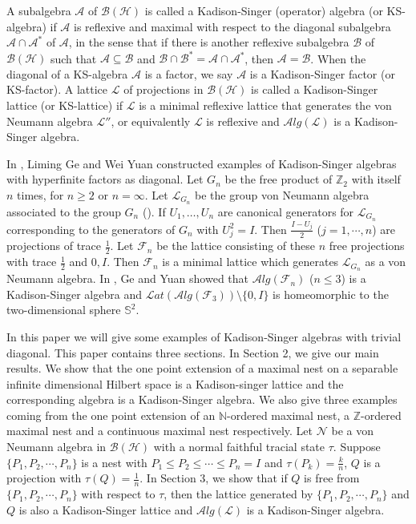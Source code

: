 \documentclass[12pt]{article}
\def\H{{\mathscr{H} }}\def\L{{\mathscr{L}}}
\def\NN{{\mathscr{ N}}}
\def\F{{\mathscr{F}}}
\def\N{{\mathbb{N}}}
\def\Z{{\mathbb{Z}}}\def\C{{\mathbb{C}}}
\def\Lat{{\mathcal Lat}}\def\Alg{{\mathcal Alg}}
\newcommand{\BBB}{\mathcal B}
\def\Lat{\mathcal Lat}
\def\Alg{\mathcal Alg}
\def\C{\mathbb C} %
\def\Z{\mathbb Z} %
\def\N{\mathbb N} %
\begin{document}
\quad A subalgebra $\mathscr{A}$ of
$\BBB(\H)$ is called a Kadison-Singer (operator) algebra (or
KS-algebra) if $\mathscr{A}$ is reflexive and maximal with respect
to the diagonal subalgebra $\mathscr{A}\cap \mathscr{A}^*$ of
$\mathscr{A}$, in the sense that if there is another reflexive
subalgebra $\mathscr{B}$ of $\BBB(\H)$ such that
$\mathscr{A}\subseteq\mathscr{B}$ and
$\mathscr{B}\cap\mathscr{B}^*=\mathscr{A}\cap\mathscr{A}^*$, then
$\mathscr{A}=\mathscr{B}$. When the diagonal of a KS-algebra
$\mathscr{A}$ is a factor, we say $\mathscr{A}$ is a Kadison-Singer
factor (or KS-factor). A lattice $\L$ of projections in $\BBB(\H)$
is called a Kadison-Singer lattice (or KS-lattice) if $\L$ is a
minimal reflexive lattice that generates the von Neumann algebra
$\L''$, or equivalently $\L$ is reflexive and $\Alg(\L)$ is a
Kadison-Singer algebra.\newline

In \cite{GY1}, Liming Ge and Wei Yuan constructed examples of
Kadison-Singer algebras with  hyperfinite factors as diagonal. Let
$G_n$ be the free product of $\Z_2$ with itself $n$ times, for
$n\ge2$ or $n=\infty$. Let $\L_{G_n}$ be the group von Neumann
algebra associated to the group $G_n$ (\cite{KR}). If
$U_1,\ldots,U_n$ are canonical generators for $\L_{G_n}$
corresponding to the generators of $G_n$ with $U_j^2=I$. Then
$\frac{I-U_j}2$ ($j=1, \cdots, n$) are projections of trace
$\frac12$. Let $\mathscr{F}_n$ be the lattice consisting of these
$n$ free projections with trace $\frac{1}{2}$ and $0, I$. Then
$\F_n$ is a minimal lattice which generates $\L_{G_n}$ as a von
Neumann algebra. In \cite{GY2}, Ge and Yuan showed that $\Alg(\F_n)$
($n\leq3$) is a Kadison-Singer algebra and
$\Lat(\Alg(\F_3))\setminus \{0,I\}$ is homeomorphic to the
two-dimensional sphere $\mathbb{S}^2$.\newline

In this paper we will give some examples of Kadison-Singer algebras
with trivial diagonal. This paper contains three sections. In
Section 2, we give our main results. We show that the one point
extension of a maximal nest on a separable infinite dimensional
Hilbert space is a Kadison-singer lattice and
 the corresponding algebra is a Kadison-Singer algebra. We also give three examples coming from the one point
extension of an $\N$-ordered maximal nest, a $\Z$-ordered maximal
nest and a continuous maximal nest respectively. 
Let $\NN$ be a von Neumann algebra in $\BBB(\H)$ with a normal faithful tracial state $\tau$. Suppose  $\{P_1, P_2, \cdots, P_n\}$ is a nest with $ P_1\leq  P_2\leq \cdots \leq  P_n=I$ and $\tau(P_k)=\frac{k}{n}$,  $Q$ is a projection with  $\tau(Q)=\frac{1}{n}$. In
Section 3, we show that if $Q$ is free from $\{P_1, P_2, \cdots, P_n\}$ with respect to $\tau$, then the lattice generated by $\{P_1, P_2, \cdots, P_n\}$ and $Q$ is also a Kadison-Singer lattice and $\Alg(\L)$ is a Kadison-Singer algebra.
\end{document}
